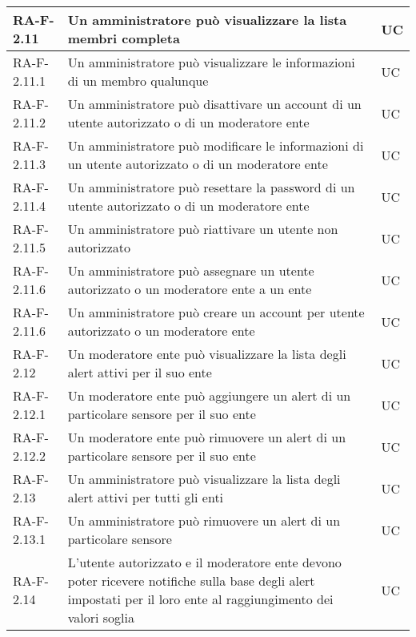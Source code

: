 \begin{center}
\begin{longtable}{|p{3cm}|p{9.85cm}|p{2cm}|}
		{\color{gray} RA-F-}2.11 & Un amministratore può visualizzare la lista membri completa & UC \\ \hline
		{\color{gray} RA-F-}2.11.1 & Un amministratore può visualizzare le informazioni di un membro qualunque & UC \\ \hline
		{\color{gray} RA-F-}2.11.2 & Un amministratore può disattivare un account di un utente autorizzato o di un moderatore ente & UC \\ \hline
		{\color{gray} RA-F-}2.11.3 & Un amministratore può modificare le informazioni di un utente autorizzato o di un moderatore ente & UC \\ \hline
		{\color{gray} RA-F-}2.11.4 & Un amministratore può resettare la password di un utente autorizzato o di un moderatore ente & UC \\ \hline
		{\color{gray} RA-F-}2.11.5 & Un amministratore può riattivare un utente non autorizzato & UC \\ \hline
		{\color{gray} RA-F-}2.11.6 & Un amministratore può assegnare un utente autorizzato o un moderatore ente a un ente & UC \\ \hline
		{\color{gray} RA-F-}2.11.6 & Un amministratore può creare un account per utente autorizzato o un moderatore ente & UC \\ \hline

		{\color{gray} RA-F-}2.12 & Un moderatore ente può visualizzare la lista degli alert attivi per il suo ente & UC \\ \hline
		{\color{gray} RA-F-}2.12.1 & Un moderatore ente può aggiungere un alert di un particolare sensore per il suo ente & UC \\ \hline
		{\color{gray} RA-F-}2.12.2 & Un moderatore ente può rimuovere un alert di un particolare sensore per il suo ente & UC \\ \hline
		{\color{gray} RA-F-}2.13 & Un amministratore può visualizzare la lista degli alert attivi per tutti gli enti & UC \\ \hline
		{\color{gray} RA-F-}2.13.1 & Un amministratore può rimuovere un alert di un particolare sensore & UC \\ \hline
		{\color{gray} RA-F-}2.14 & L'utente autorizzato e il moderatore ente devono poter ricevere notifiche sulla base degli alert impostati per il loro ente al raggiungimento dei valori soglia & UC \\ \hline


\end{longtable}
\end{center}
